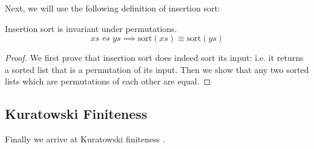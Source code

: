 Next, we will use the following definition of insertion sort:
\begin{lemma}
  Insertion sort is invariant under permutations.
  \begin{equation}
    \mathit{xs} \leftrightsquigarrow \mathit{ys} \implies \text{sort}(\mathit{xs}) \equiv \text{sort}(\mathit{ys})
  \end{equation}
\end{lemma}
\begin{proof}
  We first prove that insertion sort does indeed sort its input: i.e. it returns
  a sorted list that is a permutation of its input.
  Then we show that any two sorted lists which are permutations of each other
  are equal.
\end{proof}
\subsection{Kuratowski Finiteness} \label{kuratowski}
Finally we arrive at Kuratowski finiteness
\cite{kuratowskiNotionEnsembleFini1920}.
